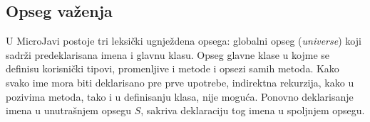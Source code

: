 \subsection*{Opseg važenja}

U MicroJavi postoje tri leksički ugnježdena opsega: globalni opseg (\textit{universe}) koji sadrži predeklarisana imena i glavnu klasu. Opseg glavne klase u kojme se definisu korisnički tipovi, promenljive i metode i opsezi samih metoda. Kako svako ime mora biti deklarisano pre prve upotrebe, indirektna rekurzija, kako u pozivima metoda, tako i u definisanju klasa, nije moguća. Ponovno deklarisanje imena u unutrašnjem opsegu $S$, sakriva deklaraciju tog imena u spoljnjem opsegu.

